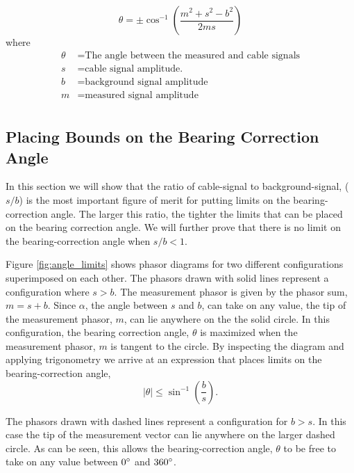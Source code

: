 \documentclass[paper=a4, fontsize=11pt]{scrartcl}
\numberwithin{equation}{section}		%
\numberwithin{figure}{section}			%
\numberwithin{table}{section}				%
\begin{document}
\begin{appendices}
\begin{equation} \label{eq:theta_solution}
\theta = \pm \cos^{-1}\left(\frac{m^2 + s^2 - b^2}{2ms}\right)
\end{equation}
where
\begin{align*}
        \theta &= \text{The angle between the measured and cable signals}\\
        s &= \text{cable signal amplitude.}\\
        b &= \text{background signal amplitude} \\
        m &= \text{measured signal amplitude} \\
\end{align*}


\subsection{Placing Bounds on the Bearing Correction Angle}\label{section:angle_bounds}
In this section we will show that the ratio of cable-signal to background-signal, ($s/b$) is the most important figure of merit for putting limits on the bearing-correction angle. The larger this ratio, the tighter the limits that can be placed on the bearing correction angle. We will further prove that there is no limit on the bearing-correction angle when $s/b < 1$.




Figure \ref{fig:angle_limits} shows phasor diagrams for two different configurations superimposed on each other.  The phasors drawn with solid lines represent a configuration where $s>b$.  The measurement phasor is given by the phasor sum, $m=s+b$.  Since $\alpha$, the angle between $s$ and $b$, can take on any value, the tip of the measurement phasor,  $m$, can lie anywhere on the the solid circle.  In this configuration, the bearing correction angle, $\theta$ is maximized when the measurement phasor, $m$ is tangent to the circle.  By inspecting the diagram and applying trigonometry we arrive at an expression that places limits on the bearing-correction angle, 
\begin{equation} \label{eq:angle_limits}
    \left| \theta \right| \leq \sin^{-1}\left(\frac{b}{s}\right).
\end{equation}

The phasors drawn with dashed lines represent a configuration for $b > s$.  In this case the tip of the measurement vector can lie anywhere on the larger dashed circle.  As can be seen, this allows the bearing-correction angle, $\theta$ to be free to take on any value between $0\degree$ and $360\degree$.


\end{appendices}
\end{document}
